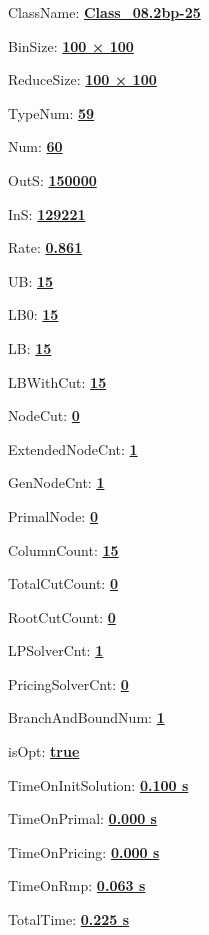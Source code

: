 \documentclass[11pt]{article}
\begin{document}
\pagestyle{empty}


ClassName: \underline{\textbf{Class_08.2bp-25}}
\par
BinSize: \underline{\textbf{100 × 100}}
\par
ReduceSize: \underline{\textbf{100 × 100}}
\par
TypeNum: \underline{\textbf{59}}
\par
Num: \underline{\textbf{60}}
\par
OutS: \underline{\textbf{150000}}
\par
InS: \underline{\textbf{129221}}
\par
Rate: \underline{\textbf{0.861}}
\par
UB: \underline{\textbf{15}}
\par
LB0: \underline{\textbf{15}}
\par
LB: \underline{\textbf{15}}
\par
LBWithCut: \underline{\textbf{15}}
\par
NodeCut: \underline{\textbf{0}}
\par
ExtendedNodeCnt: \underline{\textbf{1}}
\par
GenNodeCnt: \underline{\textbf{1}}
\par
PrimalNode: \underline{\textbf{0}}
\par
ColumnCount: \underline{\textbf{15}}
\par
TotalCutCount: \underline{\textbf{0}}
\par
RootCutCount: \underline{\textbf{0}}
\par
LPSolverCnt: \underline{\textbf{1}}
\par
PricingSolverCnt: \underline{\textbf{0}}
\par
BranchAndBoundNum: \underline{\textbf{1}}
\par
isOpt: \underline{\textbf{true}}
\par
TimeOnInitSolution: \underline{\textbf{0.100 s}}
\par
TimeOnPrimal: \underline{\textbf{0.000 s}}
\par
TimeOnPricing: \underline{\textbf{0.000 s}}
\par
TimeOnRmp: \underline{\textbf{0.063 s}}
\par
TotalTime: \underline{\textbf{0.225 s}}
\par
\newpage


\end{document}
